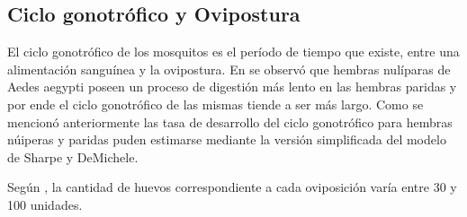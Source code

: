 \subsection{Ciclo gonotrófico y Ovipostura}
\label{subsec:cap4-ciclo-gontrofico-ovipostura}
El ciclo gonotrófico de los mosquitos es el período de tiempo que existe, entre una alimentación
sanguínea y la ovipostura. En \cite{edman1987host} se observó que hembras nulíparas de Aedes
aegypti poseen un proceso de digestión más lento en las hembras paridas y por ende el ciclo
gonotrófico de las mismas tiende a ser más largo. Como se mencionó anteriormente las tasa de
desarrollo del ciclo gonotrófico para hembras núiperas y paridas puden estimarse mediante la
versión simplificada del modelo de Sharpe y DeMichele.

Según \cite{luevano1993ciclo, beltran2001bionomia, cabezas2005dengue}, la cantidad de huevos
correspondiente a cada oviposición varía entre 30 y 100 unidades.
